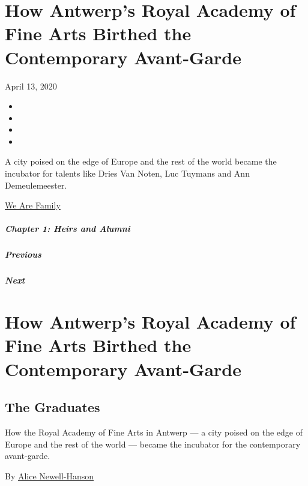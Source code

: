 \hypertarget{how-antwerps-royal-academy-of-fine-arts-birthed-the-contemporary-avant-garde}{%
\section{How Antwerp's Royal Academy of Fine Arts Birthed the
Contemporary
Avant-Garde}\label{how-antwerps-royal-academy-of-fine-arts-birthed-the-contemporary-avant-garde}}

April 13, 2020

\begin{itemize}
\item
\item
\item
\item
\end{itemize}

A city poised on the edge of Europe and the rest of the world became the
incubator for talents like Dries Van Noten, Luc Tuymans and Ann
Demeulemeester.

\href{https://www.nytimes.com/interactive/2020/04/13/t-magazine/culture-issue-2020.html}{We
Are Family}

\hypertarget{chapter-1-heirs-and-alumni}{%
\subparagraph{Chapter 1: Heirs and
Alumni}\label{chapter-1-heirs-and-alumni}}

\hypertarget{previous}{%
\subparagraph{Previous}\label{previous}}

\hypertarget{next}{%
\subparagraph{Next}\label{next}}

\hypertarget{how-antwerps-royal-academy-of-fine-arts-birthed-the-contemporary-avant-garde-1}{%
\section{How Antwerp's Royal Academy of Fine Arts Birthed the
Contemporary
Avant-Garde}\label{how-antwerps-royal-academy-of-fine-arts-birthed-the-contemporary-avant-garde-1}}

\hypertarget{the-graduates}{%
\subsection{The Graduates}\label{the-graduates}}

How the Royal Academy of Fine Arts in Antwerp --- a city poised on the
edge of Europe and the rest of the world --- became the incubator for
the contemporary avant-garde.

By \href{https://www.nytimes.com/by/alice-newell-hanson}{Alice
Newell-Hanson}

